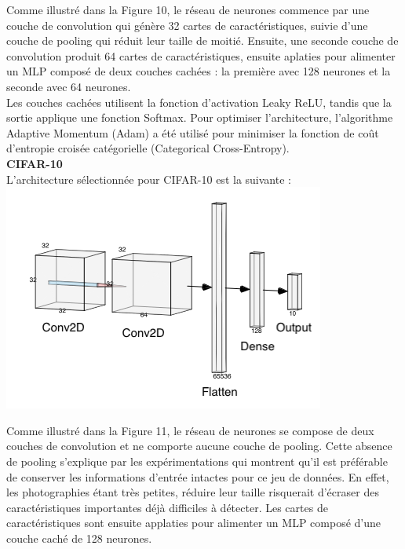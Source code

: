 \begin{multicols}{2}
Comme illustré dans la Figure 10, le réseau de neurones commence par une couche de convolution qui 
génère 32 cartes de caractéristiques, suivie d’une couche de pooling qui réduit leur taille de moitié.
Ensuite, une seconde couche de convolution produit 64 cartes de caractéristiques, ensuite aplaties pour alimenter 
un MLP composé de deux couches cachées : la première avec 128 neurones et la seconde avec 64 neurones. \\

Les couches cachées utilisent la fonction d’activation Leaky ReLU, tandis que la sortie 
applique une fonction Softmax. Pour optimiser l'architecture, l’algorithme Adaptive Momentum (Adam) a été utilisé pour minimiser 
la fonction de coût d’entropie croisée catégorielle (Categorical Cross-Entropy). \\

\textbf{CIFAR-10} \\

L'architecture sélectionnée pour CIFAR-10 est la suivante : \\

\includegraphics[width=\columnwidth]{images/cifar10_nn.png}
\hfill\break

Comme illustré dans la Figure 11, le réseau de neurones se compose de deux couches de 
convolution et ne comporte aucune couche de pooling. Cette absence de pooling
s’explique par les expérimentations qui montrent qu’il est préférable de conserver 
les informations d’entrée intactes pour ce jeu de données. En effet, les photographies 
étant très petites, réduire leur taille risquerait d'écraser des caractéristiques importantes déjà 
difficiles à détecter. Les cartes de caractéristiques sont ensuite applaties pour alimenter
un MLP composé d'une couche caché de 128 neurones. \\


\end{multicols}
